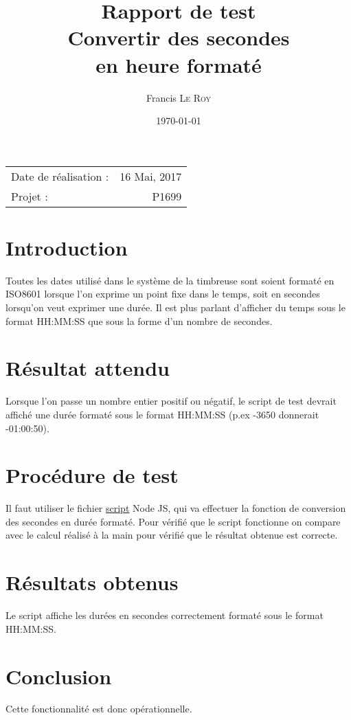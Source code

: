 \documentclass[10pt,a4paper,onecolumn]{article}
\title{Rapport de test \\ Convertir des secondes \\ en heure formaté}
\author{Francis \textsc{Le Roy}}
\date{\today}
\begin{document}
\maketitle
\thispagestyle{fancy}

\begin{center}
\begin{tabular}{l r}
Date de réalisation : & 16 Mai, 2017 \\
Projet : & P1699 \\
\end{tabular}
\end{center}

\section{Introduction}
Toutes les dates utilisé dans le système de la timbreuse sont soient formaté en ISO8601 lorsque l'on exprime un point fixe dans le temps, soit en secondes lorsqu'on veut exprimer une durée. Il est plus parlant d'afficher du temps sous le format HH:MM:SS que sous la forme d'un nombre de secondes.
\section{Résultat attendu}
Lorsque l'on passe un nombre entier positif ou négatif, le script de test devrait affiché une durée formaté sous le format HH:MM:SS (p.ex -3650 donnerait -01:00:50).
\section{Procédure de test}
Il faut utiliser le fichier \href{run:../../../test/secondsToDateConverter.js}{script} Node JS, qui va effectuer la fonction de conversion des secondes en durée formaté. Pour vérifié que le script fonctionne on compare avec le calcul réalisé à la main pour vérifié que le résultat obtenue est correcte.
\section{Résultats obtenus}
Le script affiche les durées en secondes correctement formaté sous le format HH:MM:SS.
\section{Conclusion}
Cette fonctionnalité est donc opérationnelle.
\end{document}
